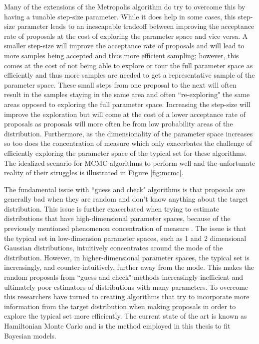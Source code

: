 Many of the extensions of the Metropolis algorithm do try to overcome this by having a tunable step-size parameter. While it does help in some cases, this step-size parameter leads to an inescapable tradeoff between improving the acceptance rate of proposals at the cost of exploring the parameter space and vice versa. A smaller step-size will improve the acceptance rate of proposals and will lead to more samples being accepted and thus more efficient sampling; however, this comes at the cost of not being able to explore or tour the full parameter space as efficiently and thus more samples are needed to get a representative sample of the parameter space. These small steps from one proposal to the next will often result in the samples staying in the same area and often ``re-exploring" the same areas opposed to exploring the full parameter space. Increasing the step-size will improve the exploration but will come at the cost of a lower acceptance rate of proposals as proposals will more often be from low probability areas of the distribution. Furthermore, as the dimensionality of the parameter space increases so too does the concentration of measure which only exacerbates the challenge of efficiently exploring the parameter space of the typical set for these algorithms. The idealized scenario for MCMC algorithms to perform well and the unfortunate reality of their struggles is illustrated in Figure \ref{fig:mcmc}.

The fundamental issue with ``guess and check" algorithms is that proposals are generally bad when they are random and don't know anything about the target distribution. This issue is further exacerbated when trying to estimate distributions that have high-dimensional parameter spaces, because of the previously mentioned phenomenon concentration of measure \cite{Betancourt2017} \cite{Carpenter2017}. The issue is that the typical set in low-dimension parameter spaces, such as 1 and 2 dimensional Gaussian distributions, intuitively concentrates around the mode of the distribution. However, in higher-dimensional parameter spaces, the typical set is increasingly, and counter-intuitively, further away from the mode. This makes the random proposals from ``guess and check" methods increasingly inefficient and ultimately poor estimators of distributions with many parameters. To overcome this researchers have turned to creating algorithms that try to incorporate more information from the target distribution when making proposals in order to explore the typical set more efficiently. The current state of the art is known as Hamiltonian Monte Carlo and is the method employed in this thesis to fit Bayesian models.

